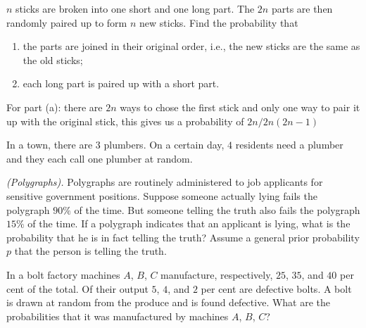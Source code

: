 \begin{problem}[Handout 3, \# 3]
  \(n\) sticks are broken into one short and one long part. The \(2n\)
  parts are then randomly paired up to form \(n\) new sticks. Find the
  probability that
  \begin{enumerate}[label=(\alph*),noitemsep]
  \item the parts are joined in their original order, i.e., the new sticks
    are the same as the old sticks;
  \item each long part is paired up with a short part.
  \end{enumerate}
\end{problem}
\begin{solution}
  For part (a): there are \(2n\) ways to chose the first stick and only one
  way to pair it up with the original stick, this gives us a probability of
  \(2n/2n(2n-1)\)
\end{solution}
\newpage

\begin{problem}[Handout 3, \# 5]
  In a town, there are \(3\) plumbers. On a certain day, \(4\) residents
  need a plumber and they each call one plumber at random.
\end{problem}
\begin{solution}

\end{solution}
\newpage

\begin{problem}[Handout 4, \# 7]
  \emph{(Polygraphs).} Polygraphs are routinely administered to job
  applicants for sensitive government positions. Suppose someone actually
  lying fails the polygraph \(90\%\) of the time. But someone telling the
  truth also fails the polygraph \(15\%\) of the time. If a polygraph
  indicates that an applicant is lying, what is the probability that he is
  in fact telling the truth? Assume a general prior probability \(p\) that
  the person is telling the truth.
\end{problem}
\begin{solution}

\end{solution}
\newpage

\begin{problem}[Handout 4, \# 8]
  In a bolt factory machines \(A\), \(B\), \(C\) manufacture, respectively,
  \(25\), \(35\), and \(40\) per cent of the total. Of their output \(5\),
  \(4\), and \(2\) per cent are defective bolts. A bolt is drawn at random
  from the produce and is found defective. What are the probabilities that
  it was manufactured by machines \(A\), \(B\), \(C\)?
\end{problem}
\begin{solution}

\end{solution}
\newpage

